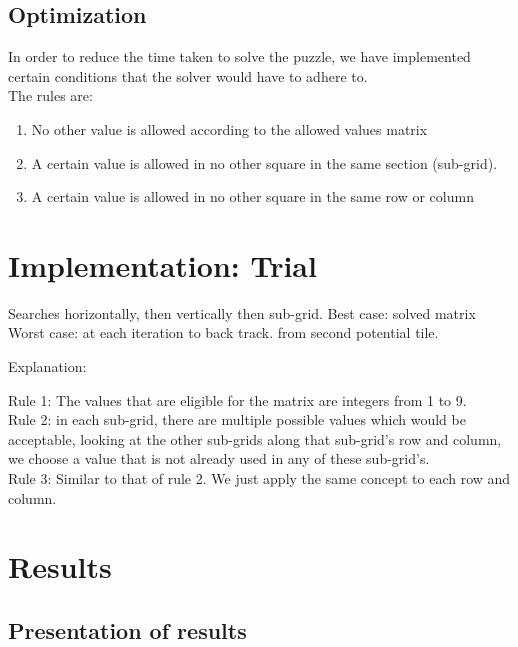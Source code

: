 \documentclass[12pt]{article}
\begin{document}
\subsection{Optimization}
In order to reduce the time taken to solve the puzzle, we have implemented certain conditions that the solver would have to adhere to. \\
The rules are: 
\begin{enumerate}
\item No other value is allowed according to the allowed values matrix
\item A certain value is allowed in no other square in the same section (sub-grid). 
\item A certain value is allowed in no other square in the same row or column
\end{enumerate}

\section{Implementation: Trial}
\begin{flushleft}
Searches horizontally, then vertically then sub-grid. 
Best case: solved matrix
Worst case: at each iteration to back track. from second potential tile. 

\end{flushleft}

\begin{flushleft}
Explanation:
\end{flushleft}  
Rule 1: The values that are  eligible for the matrix are integers from 1 to 9.\\
Rule 2: in each sub-grid, there are multiple possible values which would be acceptable, looking at the other sub-grids along that sub-grid's row and column, we choose a value that is not already used in any of these sub-grid's. \\
Rule 3: Similar to that of rule 2. We just apply the same concept to each row and column. 

\section{Results}
\subsection{Presentation of results}
\end{document}
